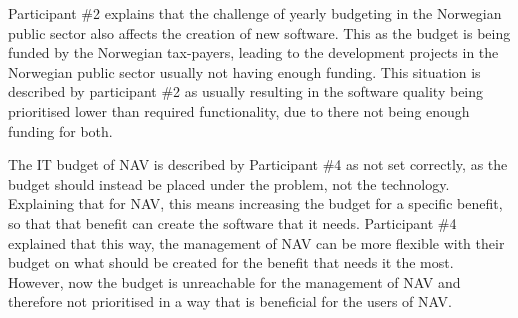 
Participant \#2 explains that the challenge of yearly budgeting in the Norwegian public sector also affects the creation of new software. This as the budget is being funded by the Norwegian tax-payers, leading to the development projects in the Norwegian public sector usually not having enough funding. This situation is described by participant \#2 as usually resulting in the software quality being prioritised lower than required functionality, due to there not being enough funding for both.


The IT budget of NAV is described by Participant \#4 as not set correctly, as the budget should instead be placed under the problem, not the technology. Explaining that for NAV, this means increasing the budget for a specific benefit, so that that benefit can create the software that it needs. Participant \#4 explained that this way, the management of NAV can be more flexible with their budget on what should be created for the benefit that needs it the most. However, now the budget is unreachable for the management of NAV and therefore not prioritised in a way that is beneficial for the users of NAV.


